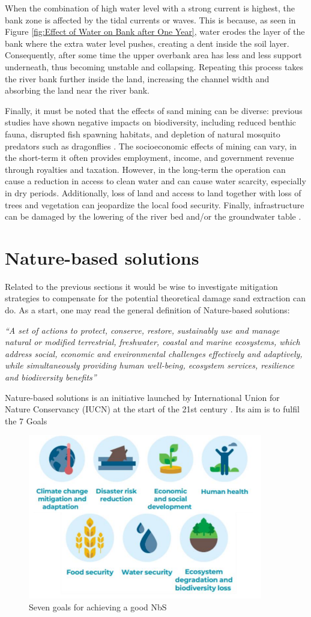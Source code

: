 When the combination of high water level with a strong current is highest, the bank zone is affected by the tidal currents or waves. This is because, as seen in Figure \ref{fig:Effect of Water on Bank after One Year}, water erodes the layer of the bank where the extra water level pushes, creating a dent inside the soil layer.
Consequently, after some time the upper overbank area has less and less support underneath, thus becoming unstable and collapsing. 
Repeating this process takes the river bank further inside the land, increasing the channel width and absorbing the land near the river bank. 

Finally, it must be noted that the effects of sand mining can be diverse: previous studies have shown negative impacts on biodiversity, including reduced benthic fauna, disrupted fish spawning habitats, and depletion of natural mosquito predators such as dragonflies \autocite{sand-mining-boek}. The socioeconomic effects of mining can vary, in the short-term it often provides employment, income, and government revenue through royalties and taxation. However, in the long-term the operation can cause a reduction in access to clean water and can cause water scarcity, especially in dry periods. Additionally, loss of land and access to land together with loss of trees and vegetation can jeopardize the local food security. Finally, infrastructure can be damaged by the lowering of the river bed and/or the groundwater table \autocite{sand-mining-boek}.

\section{Nature-based solutions}
Related to the previous sections it would be wise to investigate mitigation strategies to compensate for the potential theoretical damage sand extraction can do. As a start, one may read the general definition of Nature-based solutions:

\textit{“A set of actions to protect, conserve, restore, sustainably
use and manage natural or modified terrestrial, freshwater, coastal and marine
ecosystems, which address social, economic and environmental challenges
effectively and adaptively, while simultaneously providing human well-being,
ecosystem services, resilience and biodiversity benefits” \autocite{eiselinVerenigdeNatiesStemmen2022}}

Nature-based solutions is an initiative launched by International Union for Nature Conservancy (IUCN) at the start of the 21st century \autocite{nature based cassin jan}. Its aim is to fulfil the 7 Goals

\begin{figure}[H]
    \centering
    \includegraphics[width=0.50\linewidth]{figures/ThesevenNBSgoals.png}
    \caption{Seven goals for achieving a good NbS \autocite{dunlopEvolutionFutureResearch2024}}
    \label{fig:7g}
\end{figure}
